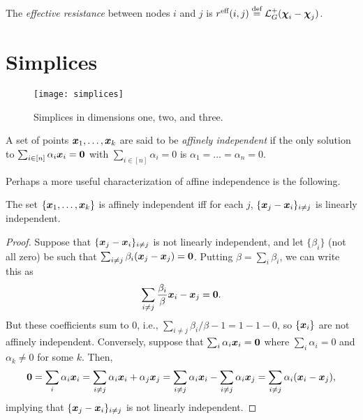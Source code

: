\begin{definition}
	The \emph{effective resistance} between nodes $i$ and $j$ is $r^{\text{eff}}(i,j) \overset{\text{def}}{=} \mathcal{L}_G^+(\boldsymbol{\chi}_i-\boldsymbol{\chi}_j)$.  
\end{definition}



\section{Simplices}
\label{sec:simplices}

\begin{figure}
	\centering
	\texttt{[image: simplices]}
	\caption{Simplices in dimensions one, two, and three. }
\end{figure}

\begin{definition}
A set of points $\vb*{x}_1,\dots,\vb*{x}_k$ are said to be \emph{affinely independent} if the only solution to $\sum_{i\in[n]}\alpha_i\vb*{x}_i=\vb{0}$ with $\sum_{i\in [n]}\alpha_i=0$ is $\alpha_1=\dots=\alpha_n=0$. 
\end{definition}

Perhaps a more useful characterization of affine independence is the following. 

\begin{lemma}
	\label{lem:affine-linearly-independent}
	The set $\{\vb*{x}_1,\dots,\vb*{x}_k\}$ is affinely independent iff for each $j$, $\{\vb*{x}_j-\vb*{x}_i\}_{i\neq j}$ is linearly independent. 
\end{lemma}
\begin{proof}
	Suppose that $\{\vb*{x}_j-\vb*{x}_i\}_{i\neq j}$ is not linearly independent, and let $\{\beta_i\}$ (not all zero) be such that $\sum_{i\neq j}\beta_i (\vb*{x}_j-\vb*{x}_j)=\vb{0}$. Putting $\beta=\sum_i \beta_i$, we can write this as 
	\[\sum_{i\neq j}\frac{\beta_i}{\beta}\vb*{x}_i - \vb*{x}_j=\vb{0}.\]
	But these coefficients sum to 0, i.e., $\sum_{i\neq j}\beta_i/\beta -1=1-1-0$, so $\{\vb*{x}_i\}$ are not affinely independent. Conversely, suppose that $\sum_i\alpha_i\vb*{x}_i=\vb{0}$ where $\sum_i\alpha_i=0$ and $\alpha_k\neq 0$ for some $k$. Then, 
	\[\vb{0} =\sum_i\alpha_i\vb*{x}_i = \sum_{i\neq j}\alpha_i\vb*{x}_i + \alpha_j\vb*{x}_j = \sum_{i\neq j}\alpha_i\vb*{x}_i - \sum_{i\neq j}\alpha_i\vb*{x}_j = \sum_{i\neq j}\alpha_i(\vb*{x}_i-\vb*{x}_j), \]
	implying that $\{\vb*{x}_j-\vb*{x}_i\}_{i\neq j}$ is not linearly independent. 
\end{proof}

